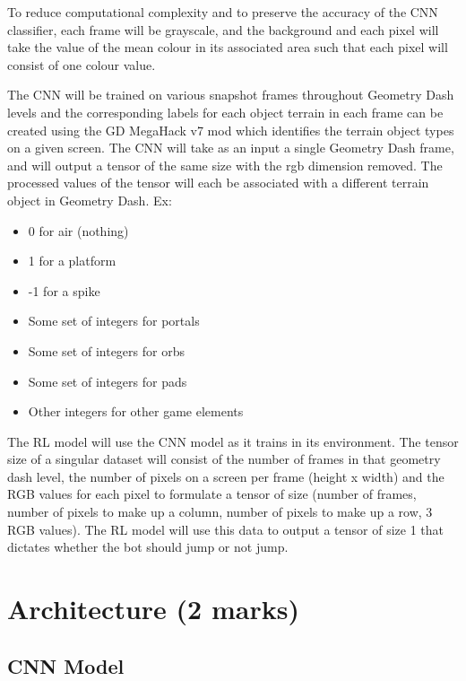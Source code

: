 \documentclass{article} %
\begin{document}
To reduce computational complexity and to preserve the accuracy of the CNN 
classifier, each frame will be grayscale, and the background and each pixel 
will take the value of the mean colour in its associated area such that each 
pixel will consist of one colour value. 

The CNN will be trained on various snapshot frames throughout Geometry Dash 
levels and the corresponding labels for each object terrain in each frame can 
be created using the GD MegaHack v7 mod which identifies the terrain object 
types on a given screen. The CNN will take as an input a single Geometry Dash 
frame, and will output a tensor of the same size with the rgb dimension removed. 
The processed values of the tensor will each be associated with a different 
terrain object in Geometry Dash. Ex: 
\begin{itemize}
\item 0 for air (nothing)
\item 1 for a platform
\item -1 for a spike
\item Some set of integers for portals
\item Some set of integers for orbs
\item Some set of integers for pads
\item Other integers for other game elements
\end{itemize}
The RL model will use the CNN model as it trains in its environment. The tensor 
size of a singular dataset will consist of the number of frames in that geometry 
dash level, the number of pixels on a screen per frame (height x width) and the 
RGB values for each pixel to formulate a tensor of size (number of frames, number 
of pixels to make up a column, number of pixels to make up a row, 3 RGB values). 
The RL model will use this data to output a tensor of size 1 that dictates 
whether 
the bot should jump or not jump. 


\section{Architecture (2 marks)}

\subsection{CNN Model}
\end{document}
